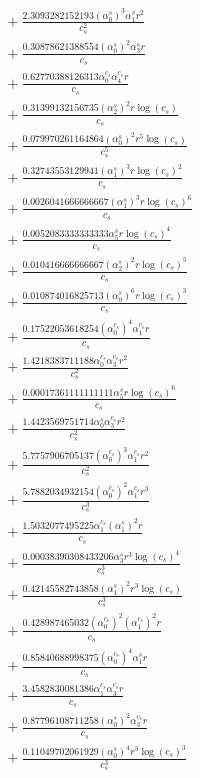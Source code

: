 \documentclass[10pt]{article}
\begin{document}
\begin{align*}
&{}  + \frac{2.3093282152193 \left(\alpha_{0}^s\right)^{3} \alpha_{1}^s r^{2}}{c_{s}^{2}} \\
&{}  + \frac{0.30878621388554 \left(\alpha_{0}^s\right)^{2} \alpha_{3}^s r}{c_{s}} \\
&{}  + \frac{0.62770388126313 \alpha_{0}^{c_s} \alpha_{4}^{c_s} r}{c_{s}} \\
&{}  + \frac{0.31399132156735 \left(\alpha_{2}^s\right)^{2} r \log{\left(c_{s} \right)}}{c_{s}} \\
&{}  + \frac{0.079970261164864 \left(\alpha_{0}^s\right)^{2} r^{5} \log{\left(c_{s} \right)}}{c_{s}^{5}} \\
&{}  + \frac{0.32743553129941 \left(\alpha_{1}^s\right)^{3} r \log{\left(c_{s} \right)}^{2}}{c_{s}} \\
&{}  + \frac{0.0026041666666667 \left(\alpha_{1}^s\right)^{3} r \log{\left(c_{s} \right)}^{6}}{c_{s}} \\
&{}  + \frac{0.0052083333333333 \alpha_{5}^s r \log{\left(c_{s} \right)}^{4}}{c_{s}} \\
&{}  + \frac{0.010416666666667 \left(\alpha_{2}^s\right)^{2} r \log{\left(c_{s} \right)}^{5}}{c_{s}} \\
&{}  + \frac{0.010874016825713 \left(\alpha_{0}^s\right)^{6} r \log{\left(c_{s} \right)}^{3}}{c_{s}} \\
&{}  + \frac{0.17522053618254 \left(\alpha_{0}^{c_s}\right)^{4} \alpha_{1}^{c_s} r}{c_{s}} \\
&{}  + \frac{1.4218383711188 \alpha_{0}^{c_s} \alpha_{3}^{c_s} r^{2}}{c_{s}^{2}} \\
&{}  + \frac{0.00017361111111111 \alpha_{5}^s r \log{\left(c_{s} \right)}^{6}}{c_{s}} \\
&{}  + \frac{1.4423569751714 \alpha_{0}^s \alpha_{3}^{c_s} r^{2}}{c_{s}^{2}} \\
&{}  + \frac{5.7757906705137 \left(\alpha_{0}^{c_s}\right)^{3} \alpha_{1}^{c_s} r^{2}}{c_{s}^{2}} \\
&{}  + \frac{5.7882034932154 \left(\alpha_{0}^{c_s}\right)^{2} \alpha_{1}^{c_s} r^{3}}{c_{s}^{3}} \\
&{}  + \frac{1.5032077495225 \alpha_{1}^{c_s} \left(\alpha_{1}^s\right)^{2} r}{c_{s}} \\
&{}  + \frac{0.00038390308433206 \alpha_{3}^s r^{3} \log{\left(c_{s} \right)}^{4}}{c_{s}^{3}} \\
&{}  + \frac{0.42145582743858 \left(\alpha_{1}^s\right)^{2} r^{3} \log{\left(c_{s} \right)}}{c_{s}^{3}} \\
&{}  + \frac{0.428987465032 \left(\alpha_{0}^{c_s}\right)^{2} \left(\alpha_{1}^{c_s}\right)^{2} r}{c_{s}} \\
&{}  + \frac{0.85840688998375 \left(\alpha_{0}^{c_s}\right)^{4} \alpha_{1}^s r}{c_{s}} \\
&{}  + \frac{3.4582830081386 \alpha_{1}^{c_s} \alpha_{3}^{c_s} r}{c_{s}} \\
&{}  + \frac{0.87796108711258 \left(\alpha_{0}^s\right)^{2} \alpha_{3}^{c_s} r}{c_{s}} \\
&{}  + \frac{0.11049702061929 \left(\alpha_{0}^s\right)^{4} r^{3} \log{\left(c_{s} \right)}^{3}}{c_{s}^{3}}
\end{align*}
\end{document}

